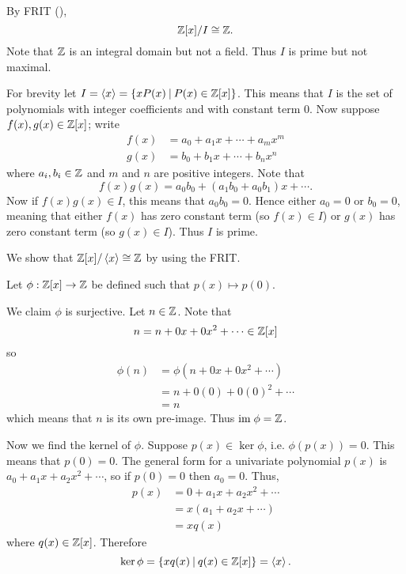 \begin{questions}
\begin{partquestions}{\roman*}
        By FRIT (),
        \[
            \mathbb{Z}[x]/I \cong \mathbb{Z}.
        \]
        Note that $\mathbb{Z}$ is an integral domain but not a field. Thus $I$ is prime but not maximal.
    \end{partquestions}
    
    \item For brevity let $I = \princ{x} = \{xP(x) \vert P(x) \in \Z[x]\}$. This means that $I$ is the set of polynomials with integer coefficients and with constant term 0. Now suppose $f(x), g(x) \in \mathbb{Z}[x]$; write
    \begin{align*}
        f(x) &= a_0 + a_1x + \cdots + a_mx^m\\
        g(x) &= b_0 + b_1x + \cdots + b_nx^n
    \end{align*}
    where $a_i, b_i \in \mathbb{Z}$ and $m$ and $n$ are positive integers. Note that
    \[
        f(x)g(x) = a_0b_0 + (a_1b_0+a_0b_1)x + \cdots.
    \]
    Now if $f(x)g(x) \in I$, this means that $a_0b_0 = 0$. Hence either $a_0 = 0$ or $b_0 = 0$, meaning that either $f(x)$ has zero constant term (so $f(x) \in I$) or $g(x)$ has zero constant term (so $g(x) \in I$). Thus $I$ is prime.

    \item We show that $\mathbb{Z}[x] / \left\langle x\right\rangle \cong \mathbb{Z}$ by using the FRIT.

    Let $\phi: \mathbb{Z}[x] \to \mathbb{Z}$ be defined such that $p(x) \mapsto p(0)$.

    We claim $\phi$ is surjective. Let $n \in \mathbb{Z}$. Note that
    \[
        n = n + 0x + 0x^2 + \cdots \in \mathbb{Z}[x]
    \]
    so
    \begin{align*}
        \phi(n) &= \phi(n + 0x + 0x^2 + \cdots)\\
        &= n + 0(0) + 0(0)^2 + \cdots\\
        &= n
    \end{align*}
    which means that $n$ is its own pre-image. Thus $\mathrm{im}\;\phi = \mathbb{Z}$.

    Now we find the kernel of $\phi$. Suppose $p(x) \in \ker\phi$, i.e. $\phi(p(x)) = 0$. This means that $p(0) = 0$. The general form for a univariate polynomial $p(x)$ is $a_0 + a_1x + a_2x^2 + \cdots$, so if $p(0) = 0$ then $a_0 = 0$. Thus,
    \begin{align*}
        p(x) &= 0 + a_1x + a_2x^2 + \cdots\\
        &= x(a_1 + a_2x + \cdots)\\
        &= xq(x)
    \end{align*}
    where $q(x) \in \mathbb{Z}[x]$. Therefore
    \[
        \ker\phi = \{xq(x) \vert q(x) \in \Z[x]\} = \princ{x}.
    \]


\end{questions}
